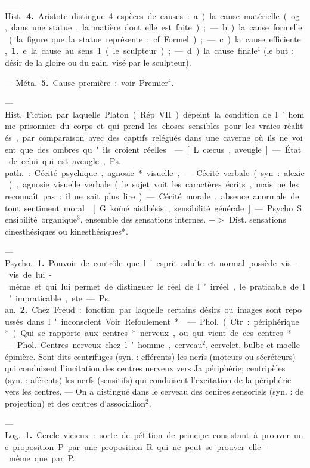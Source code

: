 \begin{itemize}[leftmargin=1cm, label=, itemsep=11pt]
—— \si{Hist.}  {\bf 4.} Aristote distingue
4 espèces de causes : a) la cause matérielle (og, dans une statue, la
matière dont elle est faite); — b) la
cause formelle (la figure que la statue
représente; cf. Formel); — c) la
cause efficiente, {\bf 1.} e. la cause au sens 1
(le sculpteur); — d) la cause finale$^1$
(le but : désir de la gloire ou du gain,
visé par le sculpteur).

— \si{Méta.}  {\bf 5.} Cause première : voir
Premier$^4$.

 — \si{Hist.}
Fiction par laquelle Platon (Rép.
VII) dépeint la condition de l’homme
prisonnier du corps et qui prend les
%
choses sensibles pour les vraies réalités, par comparaison avec des
captifs relégués dans une caverne
où ils ne voient que des ombres
qu'ils croient réelles.

 — [L. cæcus, aveugle] — État
de celui qui est aveugle, \si{Ps. path.} :
Cécité psychique, agnosie* visuelle,
— Cécité verbale (syn. : alexie),
agnosie visuelle verbale (le sujet
voit les caractères écrits, mais ne les
reconnaît pas : il ne sait plus lire).
— Cécité morale, absence anormale
de tout sentiment moral.

 [G. koïné
aisthésis, sensibilité générale]. —
Psycho. Sensibilité organique$^3$, ensemble des sensations internes.
$->$ Dist. sensations cinesthésiques
ou kinesthésiques*.

 — \si{Psycho.} {\bf 1.} Pouvoir de
contrôle que l'esprit adulte et normal possède vis-vis de lui-même
et qui lui permet de distinguer le
réel de l’irréel, le praticable de l’impraticable, ete. — \si{Ps. an.}  {\bf 2.} Chez
Freud : fonction par laquelle certains désirs ou images sont repoussés
dans l'inconscient. Voir Refoulement*.

 — \si{Phol.} (Ctr. : périphérique*).
Qui se rapporte aux centres* nerveux, ou qui vient de ces centres*.

 — \si{Phol.} Centres nerveux
chez l’homme, cerveau$^2$, cervelet,
bulbe et moelle épinière. Sont dits
centrifuges (syn. : efférents) les nerîs
(moteurs ou sécréteurs) qui conduisent l'incitation des centres nerveux
vers Ja périphérie; centripèles (syn. :
aférents) les nerfs (sensitifs) qui
conduisent l'excitation de la périphérie vers les centres. — On a distingué dans le cerveau des cenires
sensoriels (syn. : de projection) et des
centres d'associalion$^2$.

 — \si{Log.} {\bf 1.} Cercle vicieux : sorte
de pétition de principe consistant
à prouver une proposition P par
une proposition R qui ne peut se
prouver elle-même que par P.


\end{itemize}
